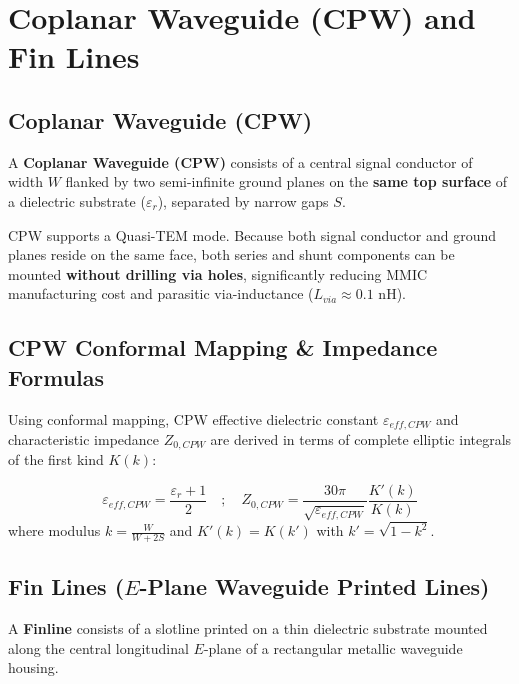 \documentclass[10pt,a4paper]{article}
\begin{document}
\section{Coplanar Waveguide (CPW) and Fin Lines}

\subsection{Coplanar Waveguide (CPW)}
A \textbf{Coplanar Waveguide (CPW)} consists of a central signal conductor of width $W$ flanked by two semi-infinite ground planes on the \textbf{same top surface} of a dielectric substrate ($\varepsilon_r$), separated by narrow gaps $S$.

\begin{tcolorbox}[masonbox, title={Coplanar Waveguide (CPW) Advantages}]
  CPW supports a Quasi-TEM mode. Because both signal conductor and ground planes reside on the same face, both series and shunt components can be mounted \textbf{without drilling via holes}, significantly reducing MMIC manufacturing cost and parasitic via-inductance ($L_{via} \approx 0.1\text{ nH}$).
\end{tcolorbox}

\subsection{CPW Conformal Mapping \& Impedance Formulas}
Using conformal mapping, CPW effective dielectric constant $\varepsilon_{eff,CPW}$ and characteristic impedance $Z_{0,CPW}$ are derived in terms of complete elliptic integrals of the first kind $K(k)$:

\begin{tcolorbox}[formulabox, title={CPW Closed-Form Impedance Expressions}]
  \begin{equation}
    \varepsilon_{eff,CPW} = \frac{\varepsilon_r + 1}{2} \quad ; \quad Z_{0,CPW} = \frac{30\pi}{\sqrt{\varepsilon_{eff,CPW}}} \frac{K'(k)}{K(k)}
  \end{equation}
  where modulus $k = \frac{W}{W + 2S}$ and $K'(k) = K(k')$ with $k' = \sqrt{1 - k^2}$.
\end{tcolorbox}

\subsection{Fin Lines ($E$-Plane Waveguide Printed Lines)}
A \textbf{Finline} consists of a slotline printed on a thin dielectric substrate mounted along the central longitudinal $E$-plane of a rectangular metallic waveguide housing.
\end{document}
